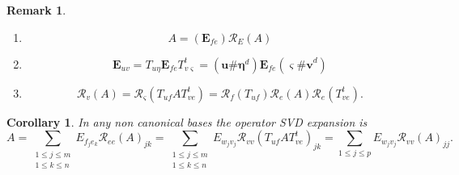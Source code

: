 \documentclass[aps,preprint]{revtex4}%
\newtheorem{corollary}[theorem]{Corollary}
\newtheorem{remark}[theorem]{Remark}
\begin{document}
\begin{remark}
\begin{enumerate}
\item
\begin{equation}
A=\left(  \boldsymbol{E}_{fe}\right)  \mathcal{R}_{E}\left(  A\right)
\end{equation}


\item
\begin{equation}
\boldsymbol{E}_{uv}=T_{u\eta}\boldsymbol{E}_{fe}T_{v\varsigma}^{t}=\left(
\mathbf{u\#}\boldsymbol{\eta}^{d}\right)  \boldsymbol{E}_{fe}\left(
\boldsymbol{\varsigma}\mathbf{\#v}^{d}\right)
\end{equation}


\item
\begin{equation}
\mathcal{R}_{v}\left(  A\right)  =\mathcal{R}_{\varsigma}\left(  T_{uf}%
AT_{ve}^{t}\right)  =\mathcal{R}_{f}\left(  T_{uf}\right)  \mathcal{R}%
_{e}\left(  A\right)  \mathcal{R}_{e}\left(  T_{ve}^{t}\right)  .
\end{equation}

\end{enumerate}
\end{remark}

\begin{corollary}
In any non canonical bases the operator SVD expansion is
\begin{equation}
A=\sum_{\substack{1\leq j\leq m\\1\leq k\leq n}}E_{f_{j}e_{k}}\mathcal{R}%
_{ee}\left(  A\right)  _{jk}=\sum_{\substack{1\leq j\leq m\\1\leq k\leq
n}}E_{w_{j}v_{j}}\mathcal{R}_{vv}\left(  T_{uf}AT_{ve}^{t}\right)  _{jk}%
=\sum_{1\leq j\leq p}E_{w_{j}v_{j}}\mathcal{R}_{vv}\left(  A\right)  _{jj}.
\end{equation}

\end{corollary}

\appendix{}
\end{document}
